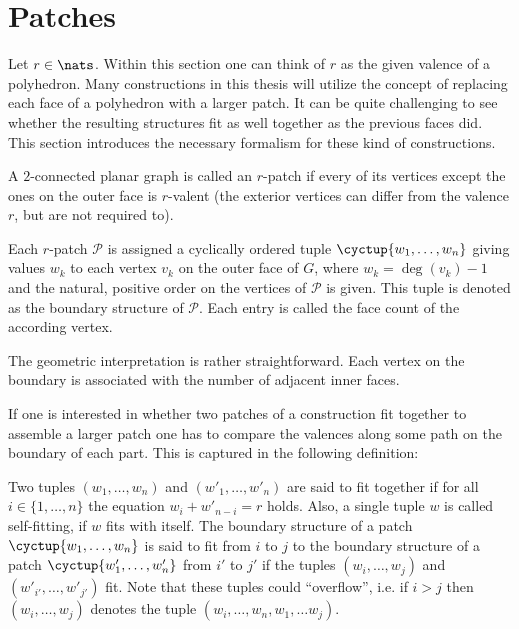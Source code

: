 \section{Patches}

Let $r \in \nats$. Within this section one can think of $r$ as the given valence of a polyhedron. Many constructions in this thesis will utilize the concept of replacing each face of a polyhedron with a larger patch. It can be quite challenging to see whether the resulting structures fit as well together as the previous faces did. This section introduces the necessary formalism for these kind of constructions.

\begin{definition}[Patch] A $2$-connected planar graph is called an $r$-patch if every of its vertices except the ones on the outer face is $r$-valent (the exterior vertices can differ from the valence $r$, but are not required to).
\end{definition}

\begin{definition} Each $r$-patch $\mathcal{P}$ is assigned a cyclically ordered tuple $\cyctup{w_1, \dots, w_n}$ giving values $w_k$ to each vertex $v_k$ on the outer face of $G$, where $w_k = \deg(v_k) - 1$ and the natural, positive order on the vertices of $\mathcal{P}$ is given. This tuple is denoted as the boundary structure of $\mathcal{P}$. Each entry is called the face count of the according vertex.
\end{definition}

The geometric interpretation is rather straightforward. Each vertex on the boundary is associated with the number of adjacent inner faces.

If one is interested in whether two patches of a construction fit together to assemble a larger patch one has to compare the valences along some path on the boundary of each part. This is captured in the following definition:
\begin{definition}
  Two tuples $(w_1, \dots, w_n)$ and $(w'_1, \dots, w'_n)$ are said to fit together if for all $i \in \{1, \dots, n \}$ the equation $w_i + w'_{n-i} = r$ holds. Also, a single tuple $w$ is called self-fitting, if $w$ fits with itself. The boundary structure of a patch $\cyctup{w_1, \dots, w_n}$ is said to fit from $i$ to $j$ to the boundary structure of a patch $\cyctup{w'_1, \dots, w'_n}$ from $i'$ to $j'$ if the tuples $(w_i, \dots, w_j)$ and $(w'_{i'}, \dots, w'_{j'})$ fit. Note that these tuples could ``overflow'', i.e. if $i > j$ then $(w_i, \dots, w_j)$ denotes the tuple $(w_i, \dots, w_n, w_1, \dots w_j)$.
\end{definition}

